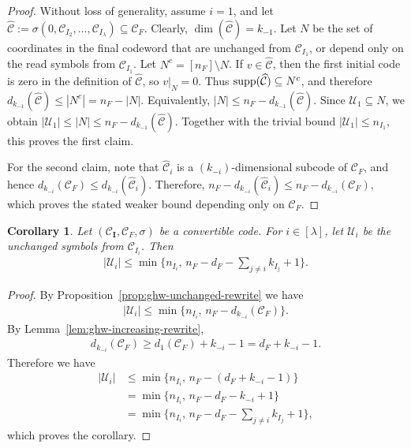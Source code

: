 \documentclass[conference, 10pt]{IEEEtran}
\theoremstyle{plain}
\newtheorem{corollary}[theorem]{Corollary}
\theoremstyle{definition}
\newcommand{\supp}{\textup{supp}}
\newcommand{\mC}{\mathcal{C}}
\newcommand{\mU}{\mathcal{U}}
\begin{document}
\begin{proof}
Without loss of generality, assume $i=1$, and let $\widehat{\mC}:=\sigma(0,\mC_{I_2},\dots,\mC_{I_\lambda})\subseteq \mC_F.$
Clearly, $\dim(\widehat{\mC})=k_{-1}$. Let $N$ be the set of coordinates in the final codeword that are unchanged from $\mC_{I_1}$,
or depend only on the read symbols from $\mC_{I_1}$. Let $N^c=[n_F]\setminus N$. If $v\in \widehat{\mC}$, then the first initial code is zero in the definition of $\widehat{\mC}$, so $v|_N=0$. Thus $\supp(\widehat{\mC})\subseteq N^c$, and therefore $d_{k_{-1}}(\widehat{\mC})\le |N^c|=n_F-|N|.$ 
Equivalently,
$|N|\le n_F-d_{k_{-1}}(\widehat{\mC})$.
Since $\mU_1\subseteq N$, we obtain
$|\mU_1|\le |N|\le n_F-d_{k_{-1}}(\widehat{\mC}).$
Together with the trivial bound $|\mU_1|\le n_{I_1}$, this proves the first claim.

For the second claim, note that $\widehat{\mC}_i$ is a $(k_{-i})$-dimensional subcode of $\mC_F$, and hence
$d_{k_{-i}}(\mC_F)\le d_{k_{-i}}(\widehat{\mC}_i).$
Therefore,
$n_F-d_{k_{-i}}(\widehat{\mC}_i)\le n_F-d_{k_{-i}}(\mC_F),$
which proves the stated weaker bound depending only on $\mC_F$.
\end{proof}

\begin{corollary}\label{cor:unchanged1}
Let $(\mC_{\textbf{I}},\mC_F,\sigma)$ be a convertible code. For $i\in [\lambda]$, let $\mU_i$ be the unchanged symbols from $\mC_{I_i}$. Then
\begin{align*} |\mU_i|\le \min\{n_{I_i},\, n_F-d_F-\textstyle\sum_{j\ne i} k_{I_j}+1\}. \end{align*}
\end{corollary}

\begin{proof}
By Proposition~\ref{prop:ghw-unchanged-rewrite} we have
\begin{align*} |\mU_i|\le \min\{n_{I_i},\, n_F-d_{k_{-i}}(\mC_F)\}. \end{align*}
By Lemma~\ref{lem:ghw-increasing-rewrite},
\begin{align*} d_{k_{-i}}(\mC_F)\ge d_1(\mC_F)+k_{-i}-1=d_F+k_{-i}-1. \end{align*}
Therefore we have
\begin{align*}
|\mU_i|&\le \min\{n_{I_i},\, n_F-(d_F+k_{-i}-1)\}\\&
=\min\{n_{I_i},\, n_F-d_F-k_{-i}+1\} \\
&=\min\{n_{I_i},\, n_F-d_F-\textstyle\sum_{j\ne i} k_{I_j}+1\},
\end{align*}
which proves the corollary.
\end{proof}
\end{document}
